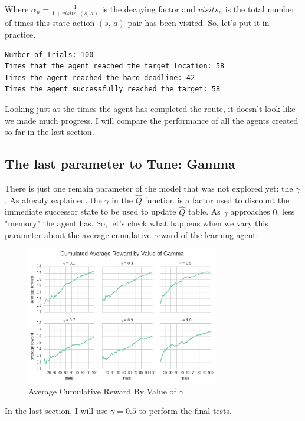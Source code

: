 \documentclass[a4paper]{article}
\begin{document}
Where $\alpha_{n} = \frac{1}{1 + visits_{n}(s, \,a)}$ is the decaying factor and $visits_{n}$ is the total number of times this state-action $(s, \, a)$ pair has been visited. So, let's put it in practice.

\begin{lstlisting}
Number of Trials: 100
Times that the agent reached the target location: 58
Times the agent reached the hard deadline: 42
Times the agent successfully reached the target: 58
\end{lstlisting}

Looking just at the times the agent has completed the route, it doesn't look like we made much progress. I will compare the performance of all the agents created so far in the last section.

\newpage
\subsection{The last parameter to Tune: Gamma}
There is just one remain parameter of the model that was not explored yet:  the $\gamma$. As already explained, the $\gamma$ in the $\hat{Q}$ function is a factor used to discount the immediate successor state to be used to update $\hat{Q}$ table. As $\gamma$ approaches $0$, less "memory" the agent has. So, let's check what happens when we vary this parameter about the average cumulative reward of the learning agent:

\begin{figure}[ht!]
\centering
\includegraphics[width=0.75\textwidth]{images/cum_reward_by_gamma.png}
\caption{\label{fig:avg_cum_rwd}Average Cumulative Reward By Value of $\gamma$}
\end{figure}

In the last section, I will use $\gamma = 0.5$ to perform the final tests.
\end{document}
